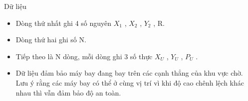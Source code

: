 Dữ liệu  
\begin{itemize}
	\item     Dòng thứ nhất ghi 4 số nguyên $X_{1}$    , $X_{2}$    , $Y_{2}$    , R.   
	\item     Dòng thứ hai ghi số N.   
	\item     Tiếp theo là N dòng, mỗi dòng ghi 3 số thực $X_{U}$    , $Y_{U}$    , $P_{U}$    .   
	\item     Dữ liệu đảm bảo máy bay đang bay trên         các cạnh thẳng        của khu vực chờ. Lưu ý rằng các máy bay có thể ở cùng vị trí vì khi độ cao chênh lệch khác nhau thì vẫn đảm bảo độ an toàn.   
\end{itemize}